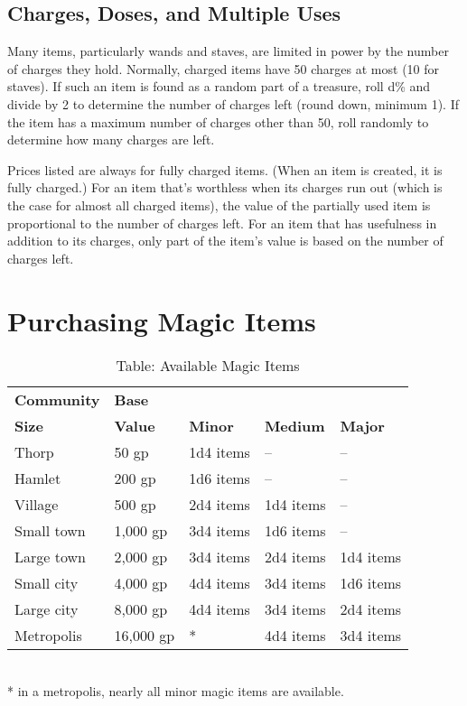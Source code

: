 \subsection{Charges, Doses, and Multiple Uses}

				
Many items, particularly wands and staves, are limited in power by the number of charges they hold. Normally, charged items have 50 charges at most (10 for staves). If such an item is found as a random part of a treasure, roll d\% and divide by 2 to determine the number of charges left (round down, minimum 1). If the item has a maximum number of charges other than 50, roll randomly to determine how many charges are left. 
				
Prices listed are always for fully charged items. (When an item is created, it is fully charged.) For an item that's worthless when its charges run out (which is the case for almost all charged items), the value of the partially used item is proportional to the number of charges left. For an item that has usefulness in addition to its charges, only part of the item's value is based on the number of charges left.
				
\section{Purchasing Magic Items}

\begin{table}[]
\sffamily
\caption{Table: Available Magic Items}
\setlength{\tabcolsep}{1pt}
\begin{tabular}{lllll}
\textbf{Community} & \textbf{Base}  \\
\textbf{Size}      & \textbf{Value} & \textbf{Minor} & \textbf{Medium} & \textbf{Major}\\
Thorp & 50 gp & 1d4 items & -- & -- \\
 Hamlet & 200 gp & 1d6 items & -- & -- \\
 Village & 500 gp & 2d4 items & 1d4 items & -- \\
 Small town & 1,000 gp & 3d4 items & 1d6 items & -- \\
 Large town & 2,000 gp & 3d4 items & 2d4 items & 1d4 items \\
 Small city & 4,000 gp & 4d4 items & 3d4 items & 1d6 items \\
 Large city & 8,000 gp & 4d4 items & 3d4 items & 2d4 items \\
 Metropolis & 16,000 gp & * & 4d4 items & 3d4 items\\
\end{tabular}\\
* in a metropolis, nearly all minor magic items are available.\\
\end{table}


